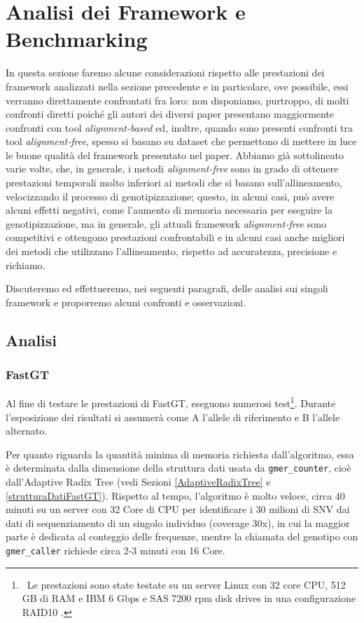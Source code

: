\documentclass[../main.tex]{subfiles}
\begin{document}
\section{Analisi dei Framework e Benchmarking}

In questa sezione faremo alcune considerazioni rispetto alle prestazioni dei framework analizzati nella sezione precedente e in particolare, ove possibile, essi verranno direttamente confrontati fra loro: non disponiamo, purtroppo, di molti confronti diretti poiché gli autori dei diversi paper presentano maggiormente confronti con tool \textit{alignment-based} ed, inoltre, quando sono presenti confronti tra tool \textit{alignment-free}, spesso si basano su dataset che permettono di mettere in luce le buone qualità del framework presentato nel paper. Abbiamo già sottolineato varie volte, che, in generale, i metodi \textit{alignment-free} sono in grado di ottenere prestazioni temporali molto inferiori ai metodi che si basano sull'allineamento, velocizzando il processo di genotipizzazione; questo, in alcuni casi, può avere alcuni effetti negativi, come l'aumento di memoria necessaria per eseguire la genotipizzazione, ma in generale, gli attuali framework \textit{alignment-free} sono competitivi e ottengono prestazioni confrontabili e in alcuni casi anche migliori dei metodi che utilizzano l'allineamento, rispetto ad accuratezza, precisione e richiamo. 

Discuteremo ed effettueremo, nei seguenti paragrafi, delle analisi sui singoli framework e proporremo alcuni confronti e osservazioni.

\subsection{Analisi}

\subsubsection{FastGT}

Al fine di testare le prestazioni di FastGT, \cite{pajuste2017fastgt} eseguono numerosi test\footnote{\ Le prestazioni sono state testate su un server Linux con 32 core CPU, 512 GB di RAM e IBM 6 Gbps e SAS 7200 rpm disk drives in una configurazione RAID10 \cite{pajuste2017fastgt}.}. Durante l'esposizione dei risultati si assumerà come A l'allele di riferimento e B l'allele alternato.

Per quanto riguarda la quantità minima di memoria richiesta dall'algoritmo, essa è determinata dalla dimensione della struttura dati usata da \texttt{gmer\_counter}, cioè dall'Adaptive Radix Tree (vedi Sezioni \ref{AdaptiveRadixTree}  e \ref{strutturaDatiFastGT}). Rispetto al tempo, l'algoritmo è molto veloce, circa 40 minuti su un server con 32 Core di CPU per identificare i 30 milioni di SNV dai dati di sequenziamento di un singolo individuo (coverage 30x), in cui la maggior parte è dedicata al conteggio delle frequenze, mentre la chiamata del genotipo con \texttt{gmer\_caller} richiede circa 2-3 minuti con 16 Core.
\end{document}
